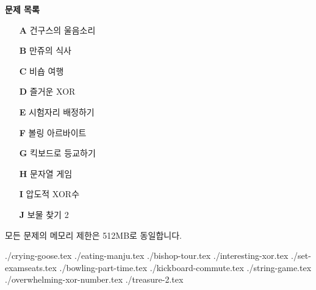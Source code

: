 \documentclass[10pt,a4paper,oneside,dvipsnames]{article}
\newcommand{\importproblem}[1]{{./#1.tex}}
\begin{document}
\BuildContestTitle


\begin{center}
    \textbf{\Large\textsf{문제 목록}}
\end{center}


\begin{center}
    \begin{minipage}{0.35\textwidth}
        \begin{itemize}
            
	\item[\textbf{A}] 건구스의 울음소리
	\item[\textbf{B}] 만쥬의 식사
	\item[\textbf{C}] 비숍 여행
	\item[\textbf{D}] 즐거운 XOR
	\item[\textbf{E}] 시험자리 배정하기
	\item[\textbf{F}] 볼링 아르바이트
	\item[\textbf{G}] 킥보드로 등교하기
	\item[\textbf{H}] 문자열 게임
	\item[\textbf{I}] 압도적 XOR수
	\item[\textbf{J}] 보물 찾기 2


        \end{itemize}    
    \end{minipage}
\end{center}

모든 문제의 메모리 제한은 512MB로 동일합니다.
\newpage

\importproblem{crying-goose}
\importproblem{eating-manju} 
\importproblem{bishop-tour} 
\importproblem{interesting-xor} 
\importproblem{set-examseats} 
\importproblem{bowling-part-time} 
\importproblem{kickboard-commute} 
\importproblem{string-game} 
\importproblem{overwhelming-xor-number} 
\importproblem{treasure-2} 
\end{document}
